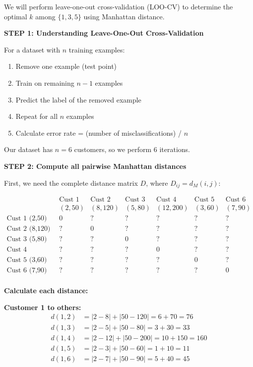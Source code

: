\documentclass[12pt]{article}
\begin{document}
\begin{solution}
We will perform leave-one-out cross-validation (LOO-CV) to determine the optimal \(k\) among \(\{1, 3, 5\}\) using Manhattan distance.

\textbf{STEP 1: Understanding Leave-One-Out Cross-Validation}

For a dataset with \(n\) training examples:
\begin{enumerate}
    \item Remove one example (test point)
    \item Train on remaining \(n-1\) examples
    \item Predict the label of the removed example
    \item Repeat for all \(n\) examples
    \item Calculate error rate = (number of misclassifications) / \(n\)
\end{enumerate}

Our dataset has \(n = 6\) customers, so we perform 6 iterations.

\textbf{STEP 2: Compute all pairwise Manhattan distances}

First, we need the complete distance matrix \(D\), where \(D_{ij} = d_M(i, j)\):

\[
\begin{array}{c|cccccc}
& \text{Cust 1} & \text{Cust 2} & \text{Cust 3} & \text{Cust 4} & \text{Cust 5} & \text{Cust 6} \\
& (2,50) & (8,120) & (5,80) & (12,200) & (3,60) & (7,90) \\
\hline
\text{Cust 1 (2,50)} & 0 & ? & ? & ? & ? & ? \\
\text{Cust 2 (8,120)} & ? & 0 & ? & ? & ? & ? \\
\text{Cust 3 (5,80)} & ? & ? & 0 & ? & ? & ? \\
\text{Cust 4 (12,200)} & ? & ? & ? & 0 & ? & ? \\
\text{Cust 5 (3,60)} & ? & ? & ? & ? & 0 & ? \\
\text{Cust 6 (7,90)} & ? & ? & ? & ? & ? & 0 \\
\end{array}
\]

\textbf{Calculate each distance:}

\textbf{Customer 1 to others:}
\begin{align*}
d(1,2) &= |2-8| + |50-120| = 6 + 70 = 76 \\
d(1,3) &= |2-5| + |50-80| = 3 + 30 = 33 \\
d(1,4) &= |2-12| + |50-200| = 10 + 150 = 160 \\
d(1,5) &= |2-3| + |50-60| = 1 + 10 = 11 \\
d(1,6) &= |2-7| + |50-90| = 5 + 40 = 45
\end{align*}


\end{solution}
\end{document}
